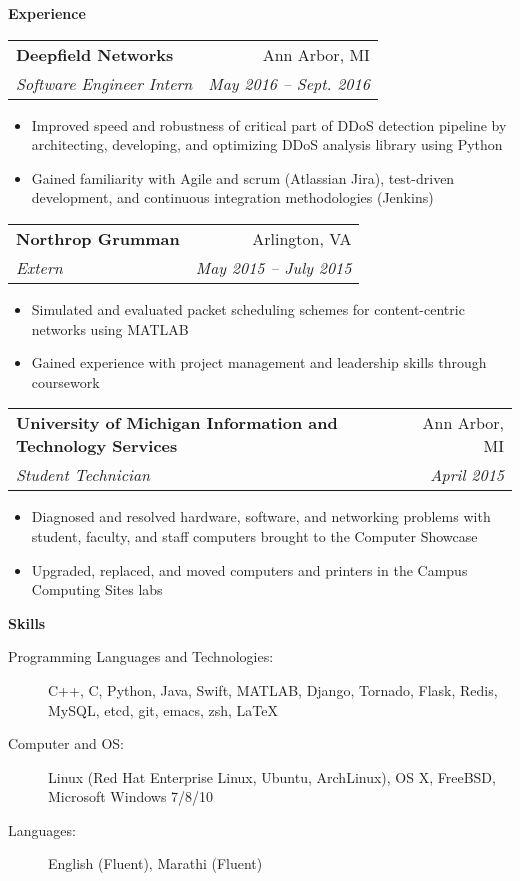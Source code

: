 \documentclass[letterpaper,11pt]{article}
\makeatletter
\newcommand{\resitem}[1]{\item #1 \vspace{-2pt}}
\newcommand{\resheading}[1]{{\large \colorbox{mygrey}{\begin{minipage}{\textwidth}{\textbf{#1 \vphantom{p\^{E}}}}\end{minipage}}}}
\newcommand{\ressubheading}[4]{
\begin{tabular*}{6.875in}{l@{\extracolsep{\fill}}r}
		\textbf{#1} & #2 \\
		\textit{#3} & \textit{#4} \\
\end{tabular*}\vspace{-6pt}}
\renewcommand{\footnotesize}{\fontsize{10pt}{11pt}\selectfont}
\makeatother
\begin{document}
		\resheading{Experience}
		\begin{description}
			\item 
			\ressubheading{Deepfield Networks}{Ann Arbor, MI}
			{Software Engineer Intern}{May 2016 -- Sept. 2016}
			{	
				\footnotesize
				\begin{itemize}
					\resitem{Improved speed and robustness of critical part of DDoS detection pipeline by architecting, developing, and optimizing DDoS analysis library using Python}
					\resitem{Gained familiarity with Agile and scrum (Atlassian Jira), test-driven development, and continuous integration methodologies (Jenkins)}
				\end{itemize}
			}
			\item 
			\ressubheading{Northrop Grumman}{Arlington, VA}
			{Extern}{May 2015 -- July 2015}
			{	
				\footnotesize
				\begin{itemize}
					\resitem{Simulated and evaluated packet scheduling schemes for content-centric networks using MATLAB}
					\resitem{Gained experience with project management and leadership skills through coursework}
				\end{itemize}
			}
			\item 
			\ressubheading{University of Michigan Information and Technology Services}{Ann Arbor, MI}
			{Student Technician}{April 2015}
			{	
				\footnotesize
				\begin{itemize}
					\resitem{Diagnosed and resolved hardware, software, and networking problems with student, faculty, and staff computers brought to the Computer Showcase}
					\resitem{Upgraded, replaced, and moved computers and printers in the Campus Computing Sites labs}
				\end{itemize}
			}
			
		\end{description}  %
		
		\resheading{Skills}
		\begin{description}
			\item[Programming Languages and Technologies:]
				{	
					\footnotesize
					C++, C, Python, Java, Swift, MATLAB, Django, Tornado, Flask, Redis, MySQL, etcd, git, emacs, zsh, \LaTeX
				}
			\item[Computer and OS:]
				{
					\footnotesize
					Linux (Red Hat Enterprise Linux, Ubuntu, ArchLinux), OS X, FreeBSD, Microsoft Windows 7/8/10
				}
			\item[Languages:]
				{
					\footnotesize
					English (Fluent), Marathi (Fluent)
				}
		\end{description} %
		
\end{document}
